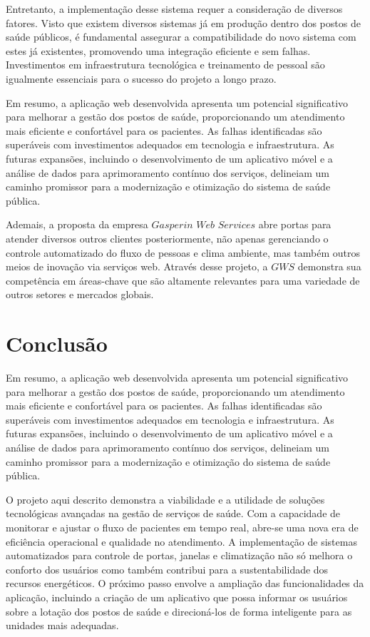 \documentclass[conference, a4paper, 12pt]{IEEEtran}
\begin{document}
  Entretanto, a implementação desse sistema requer a consideração de diversos fatores. Visto que existem diversos sistemas já em produção dentro dos postos de saúde públicos, é fundamental assegurar a compatibilidade do novo sistema com estes já existentes, promovendo uma integração eficiente e sem falhas. Investimentos em infraestrutura tecnológica e treinamento de pessoal são igualmente essenciais para o sucesso do projeto a longo prazo.

  Em resumo, a aplicação web desenvolvida apresenta um potencial significativo para melhorar a gestão dos postos de saúde, proporcionando um atendimento mais eficiente e confortável para os pacientes. As falhas identificadas são superáveis com investimentos adequados em tecnologia e infraestrutura. As futuras expansões, incluindo o desenvolvimento de um aplicativo móvel e a análise de dados para aprimoramento contínuo dos serviços, delineiam um caminho promissor para a modernização e otimização do sistema de saúde pública.

  Ademais, a proposta da empresa $Gasperin$ $Web$ $Services$ abre portas para atender diversos outros clientes posteriormente, não apenas gerenciando o controle automatizado do fluxo de pessoas e clima ambiente, mas também outros meios de inovação via serviços web. Através desse projeto, a $GWS$ demonstra sua competência em áreas-chave que são altamente relevantes para uma variedade de outros setores e mercados globais.

\section{Conclusão}
\label{sec:conclusion}

  Em resumo, a aplicação web desenvolvida apresenta um potencial significativo para melhorar a gestão dos postos de saúde, proporcionando um atendimento mais eficiente e confortável para os pacientes. As falhas identificadas são superáveis com investimentos adequados em tecnologia e infraestrutura. As futuras expansões, incluindo o desenvolvimento de um aplicativo móvel e a análise de dados para aprimoramento contínuo dos serviços, delineiam um caminho promissor para a modernização e otimização do sistema de saúde pública.

  O projeto aqui descrito demonstra a viabilidade e a utilidade de soluções tecnológicas avançadas na gestão de serviços de saúde. Com a capacidade de monitorar e ajustar o fluxo de pacientes em tempo real, abre-se uma nova era de eficiência operacional e qualidade no atendimento. A implementação de sistemas automatizados para controle de portas, janelas e climatização não só melhora o conforto dos usuários como também contribui para a sustentabilidade dos recursos energéticos. O próximo passo envolve a ampliação das funcionalidades da aplicação, incluindo a criação de um aplicativo que possa informar os usuários sobre a lotação dos postos de saúde e direcioná-los de forma inteligente para as unidades mais adequadas.
\end{document}
